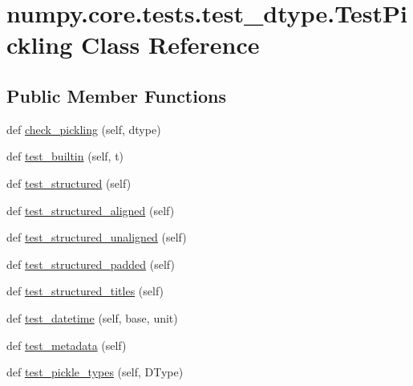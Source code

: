 \hypertarget{classnumpy_1_1core_1_1tests_1_1test__dtype_1_1TestPickling}{}\section{numpy.\+core.\+tests.\+test\+\_\+dtype.\+Test\+Pickling Class Reference}
\label{classnumpy_1_1core_1_1tests_1_1test__dtype_1_1TestPickling}
\subsection*{Public Member Functions}
\begin{DoxyCompactItemize}
\item 
def \hyperlink{classnumpy_1_1core_1_1tests_1_1test__dtype_1_1TestPickling_a7c84d7b7a8c3e69010dbf2d309045cce}{check\+\_\+pickling} (self, dtype)
\item 
def \hyperlink{classnumpy_1_1core_1_1tests_1_1test__dtype_1_1TestPickling_ae69ac9742d2471bb23b8fcaeff86a20d}{test\+\_\+builtin} (self, t)
\item 
def \hyperlink{classnumpy_1_1core_1_1tests_1_1test__dtype_1_1TestPickling_aac7cb6d0bfaf99ce1808469ffcb67c26}{test\+\_\+structured} (self)
\item 
def \hyperlink{classnumpy_1_1core_1_1tests_1_1test__dtype_1_1TestPickling_a4c2927e577af8710534fe932f87697af}{test\+\_\+structured\+\_\+aligned} (self)
\item 
def \hyperlink{classnumpy_1_1core_1_1tests_1_1test__dtype_1_1TestPickling_a43be1667e8362cf7ada309c83beedd2d}{test\+\_\+structured\+\_\+unaligned} (self)
\item 
def \hyperlink{classnumpy_1_1core_1_1tests_1_1test__dtype_1_1TestPickling_a31aa978a111fb843d1f01fe2a85390ab}{test\+\_\+structured\+\_\+padded} (self)
\item 
def \hyperlink{classnumpy_1_1core_1_1tests_1_1test__dtype_1_1TestPickling_a815ac8e43743fb034aaf274ac8b17fab}{test\+\_\+structured\+\_\+titles} (self)
\item 
def \hyperlink{classnumpy_1_1core_1_1tests_1_1test__dtype_1_1TestPickling_a166e46588245668175c7862ce8a48374}{test\+\_\+datetime} (self, base, unit)
\item 
def \hyperlink{classnumpy_1_1core_1_1tests_1_1test__dtype_1_1TestPickling_ac87ac4859837f7a852fec97e0c31d39b}{test\+\_\+metadata} (self)
\item 
def \hyperlink{classnumpy_1_1core_1_1tests_1_1test__dtype_1_1TestPickling_a5cd46fc795d544469a53c052c497b477}{test\+\_\+pickle\+\_\+types} (self, D\+Type)
\end{DoxyCompactItemize}


